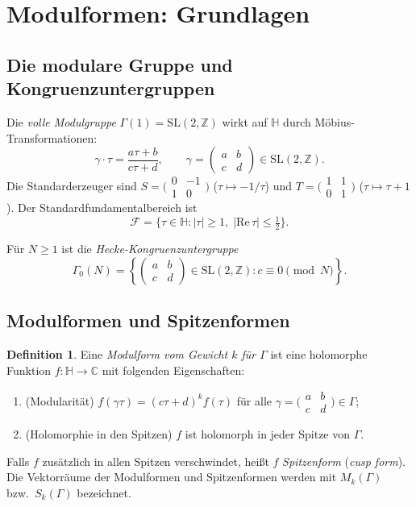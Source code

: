 \documentclass[12pt,a4paper]{amsart}
\theoremstyle{definition}
\newtheorem{definition}[theorem]{Definition}
\begin{document}
\section{Modulformen: Grundlagen}

\subsection{Die modulare Gruppe und Kongruenzuntergruppen}

Die \emph{volle Modulgruppe} $\Gamma(1) = \mathrm{SL}(2,\mathbb{Z})$ wirkt auf
$\mathbb{H}$ durch M\"obius-Transformationen:
\[
  \gamma \cdot \tau = \frac{a\tau + b}{c\tau + d}, \qquad
  \gamma = \begin{pmatrix} a & b \\ c & d \end{pmatrix} \in \mathrm{SL}(2,\mathbb{Z}).
\]
Die Standarderzeuger sind $S = \bigl(\begin{smallmatrix}0&-1\\1&0\end{smallmatrix}\bigr)$
($\tau \mapsto -1/\tau$) und $T = \bigl(\begin{smallmatrix}1&1\\0&1\end{smallmatrix}\bigr)$
($\tau \mapsto \tau + 1$). Der Standardfundamentalbereich ist
\[
  \mathcal{F} = \{\tau \in \mathbb{H} : \lvert\tau\rvert \ge 1,\;
  \lvert\mathrm{Re}\,\tau\rvert \le \tfrac{1}{2}\}.
\]

F\"ur $N \ge 1$ ist die \emph{Hecke-Kongruenzuntergruppe}
\[
  \Gamma_0(N) = \left\{ \begin{pmatrix}a&b\\c&d\end{pmatrix} \in \mathrm{SL}(2,\mathbb{Z})
  : c \equiv 0 \pmod{N} \right\}.
\]

\subsection{Modulformen und Spitzenformen}

\begin{definition}
Eine \emph{Modulform vom Gewicht $k$ f\"ur $\Gamma$} ist eine holomorphe Funktion
$f \colon \mathbb{H} \to \mathbb{C}$ mit folgenden Eigenschaften:
\begin{enumerate}[label=(\roman*)]
  \item (Modularit\"at) $f(\gamma\tau) = (c\tau+d)^k f(\tau)$ f\"ur alle
        $\gamma = \bigl(\begin{smallmatrix}a&b\\c&d\end{smallmatrix}\bigr) \in \Gamma$;
  \item (Holomorphie in den Spitzen) $f$ ist holomorph in jeder Spitze von $\Gamma$.
\end{enumerate}
Falls $f$ zus\"atzlich in allen Spitzen verschwindet, hei{\ss}t $f$
\emph{Spitzenform} (\emph{cusp form}). Die Vektorr\"aume der Modulformen
und Spitzenformen werden mit $M_k(\Gamma)$ bzw.\ $S_k(\Gamma)$ bezeichnet.
\end{definition}
\end{document}
